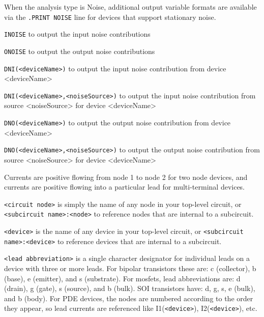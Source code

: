 \begin{Command}
\begin{Arguments}
When the analysis type is Noise, additional output variable formats are available
via the \texttt{.PRINT NOISE} line for devices that support stationary noise.
\begin{XyceItemize}
\item \texttt{INOISE} to output the input noise contributions
\item \texttt{ONOISE} to output the output noise contributions
\item \texttt{DNI(<deviceName>)} to output the input noise contribution from device <deviceName>
\item \texttt{DNI(<deviceName>,<noiseSource>)} to output the input noise contribution from
                source <noiseSource> for device <deviceName>
\item \texttt{DNO(<deviceName>)} to output the output noise contribution from device <deviceName>
\item \texttt{DNO(<deviceName>,<noiseSource>)} to output the output noise contribution from
                source <noiseSource> for device <deviceName>
\end{XyceItemize}

\end{Arguments}

\comments

\begin{XyceItemize}
\item Currents are positive flowing from node 1 to node 2 for two node
  devices, and currents are positive flowing into a particular lead for
  multi-terminal devices.

\item \texttt{<circuit node>} is simply the name of any node in your
  top-level circuit, or \texttt{<subcircuit name>:<node>} to reference
  nodes that are internal to a subcircuit.

\item \texttt{<device>} is the name of any device in your top-level
  circuit, or \texttt{<subcircuit name>:<device>} to reference devices
  that are internal to a subcircuit.

\item \texttt{<lead abbreviation>} is a single character designator for
  individual leads on a device with three or more leads.  For bipolar
  transistors these are: c (collector), b (base), e (emitter), and s
  (substrate).  For mosfets, lead abbreviations are: d (drain), g
  (gate), s (source), and b (bulk).  SOI transistors have: d, g, s, e
  (bulk), and b (body).  For PDE devices, the nodes are numbered
  according to the order they appear, so lead currents are referenced
  like I1(\texttt{<device>}), I2(\texttt{<device>}), etc.


\end{XyceItemize}
\end{Command}
